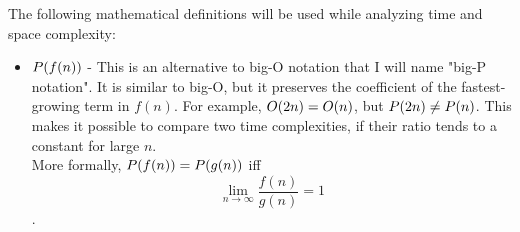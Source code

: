 The following mathematical definitions will be used while analyzing time and space complexity:

\begin{itemize}
	\item $P(f(n))$ - This is an alternative to big-O notation that I will name "big-P notation". It is similar to big-O, but it preserves the coefficient of the fastest-growing term in $f(n)$. For example, $O(2n) = O(n)$, but $P(2n) \neq P(n)$. This makes it possible to compare two time complexities, if their ratio tends to a constant for large $n$.\\
	More formally, $P(f(n)) = P(g(n))$ iff $$\lim_{n \to \infty} {\frac{f(n)}{g(n)}} = 1$$.
\end{itemize}